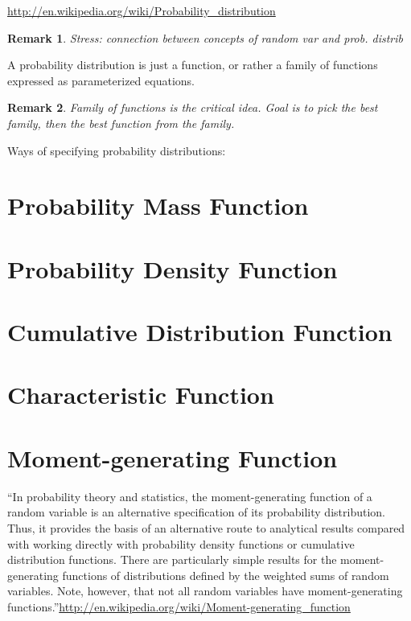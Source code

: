 \documentclass[reqno,12pt]{tufte-book}
\numberwithin{equation}{subsection}
\newtheorem{remark}{Remark}
\begin{document}
\url{http://en.wikipedia.org/wiki/Probability_distribution}


\begin{remark}
  Stress: connection between concepts of random var and prob. distrib
\end{remark}

A probability distribution is just a function, or rather a family of
functions expressed as parameterized equations.

\begin{remark}
  Family of functions is the critical idea.  Goal is to pick the best
  family, then the best function from the family.
\end{remark}

Ways of specifying probability distributions:

\section{Probability Mass Function}


\section{Probability Density Function}

\section{Cumulative Distribution Function}

\section{Characteristic Function}

\section{Moment-generating Function}

``In probability theory and statistics, the moment-generating function of a random variable is an alternative specification of its probability distribution. Thus, it provides the basis of an alternative route to analytical results compared with working directly with probability density functions or cumulative distribution functions. There are particularly simple results for the moment-generating functions of distributions defined by the weighted sums of random variables. Note, however, that not all random variables have moment-generating functions.''\url{http://en.wikipedia.org/wiki/Moment-generating_function}
\end{document}
